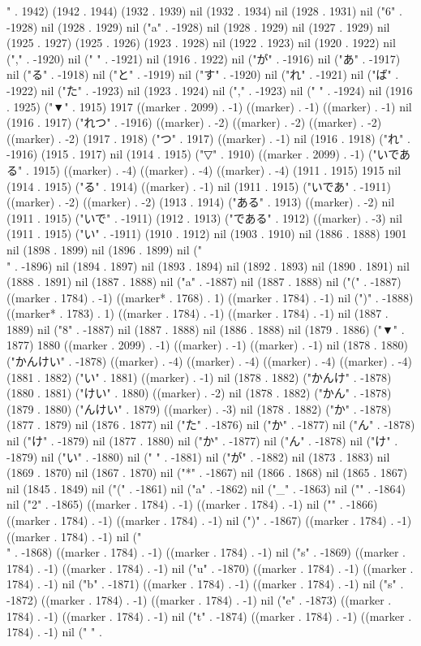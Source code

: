 " . 1942) (1942 . 1944) (1932 . 1939) nil (1932 . 1934) nil (1928 . 1931) nil ("6" . -1928) nil (1928 . 1929) nil ("a" . -1928) nil (1928 . 1929) nil (1927 . 1929) nil (1925 . 1927) (1925 . 1926) (1923 . 1928) nil (1922 . 1923) nil (1920 . 1922) nil ("," . -1920) nil (" " . -1921) nil (1916 . 1922) nil ("が" . -1916) nil ("あ" . -1917) nil ("る" . -1918) nil ("と" . -1919) nil ("す" . -1920) nil ("れ" . -1921) nil ("ば" . -1922) nil ("た" . -1923) nil (1923 . 1924) nil ("," . -1923) nil (" " . -1924) nil (1916 . 1925) ("▼" . 1915) 1917 ((marker . 2099) . -1) ((marker) . -1) ((marker) . -1) nil (1916 . 1917) ("れつ" . -1916) ((marker) . -2) ((marker) . -2) ((marker) . -2) ((marker) . -2) (1917 . 1918) ("つ" . 1917) ((marker) . -1) nil (1916 . 1918) ("れ" . -1916) (1915 . 1917) nil (1914 . 1915) ("▽" . 1910) ((marker . 2099) . -1) ("いである" . 1915) ((marker) . -4) ((marker) . -4) ((marker) . -4) (1911 . 1915) 1915 nil (1914 . 1915) ("る" . 1914) ((marker) . -1) nil (1911 . 1915) ("いであ" . -1911) ((marker) . -2) ((marker) . -2) (1913 . 1914) ("ある" . 1913) ((marker) . -2) nil (1911 . 1915) ("いで" . -1911) (1912 . 1913) ("である" . 1912) ((marker) . -3) nil (1911 . 1915) ("い" . -1911) (1910 . 1912) nil (1903 . 1910) nil (1886 . 1888) 1901 nil (1898 . 1899) nil (1896 . 1899) nil ("\\" . -1896) nil (1894 . 1897) nil (1893 . 1894) nil (1892 . 1893) nil (1890 . 1891) nil (1888 . 1891) nil (1887 . 1888) nil ("a" . -1887) nil (1887 . 1888) nil ("(" . -1887) ((marker . 1784) . -1) ((marker* . 1768) . 1) ((marker . 1784) . -1) nil (")" . -1888) ((marker* . 1783) . 1) ((marker . 1784) . -1) ((marker . 1784) . -1) nil (1887 . 1889) nil ("8" . -1887) nil (1887 . 1888) nil (1886 . 1888) nil (1879 . 1886) ("▼" . 1877) 1880 ((marker . 2099) . -1) ((marker) . -1) ((marker) . -1) nil (1878 . 1880) ("かんけい" . -1878) ((marker) . -4) ((marker) . -4) ((marker) . -4) ((marker) . -4) (1881 . 1882) ("い" . 1881) ((marker) . -1) nil (1878 . 1882) ("かんけ" . -1878) (1880 . 1881) ("けい" . 1880) ((marker) . -2) nil (1878 . 1882) ("かん" . -1878) (1879 . 1880) ("んけい" . 1879) ((marker) . -3) nil (1878 . 1882) ("か" . -1878) (1877 . 1879) nil (1876 . 1877) nil ("た" . -1876) nil ("か" . -1877) nil ("ん" . -1878) nil ("け" . -1879) nil (1877 . 1880) nil ("か" . -1877) nil ("ん" . -1878) nil ("け" . -1879) nil ("い" . -1880) nil (" " . -1881) nil ("が" . -1882) nil (1873 . 1883) nil (1869 . 1870) nil (1867 . 1870) nil ("*" . -1867) nil (1866 . 1868) nil (1865 . 1867) nil (1845 . 1849) nil ("(" . -1861) nil ("a" . -1862) nil ("_" . -1863) nil ("{" . -1864) nil ("2" . -1865) ((marker . 1784) . -1) ((marker . 1784) . -1) nil ("}" . -1866) ((marker . 1784) . -1) ((marker . 1784) . -1) nil (")" . -1867) ((marker . 1784) . -1) ((marker . 1784) . -1) nil ("\\" . -1868) ((marker . 1784) . -1) ((marker . 1784) . -1) nil ("s" . -1869) ((marker . 1784) . -1) ((marker . 1784) . -1) nil ("u" . -1870) ((marker . 1784) . -1) ((marker . 1784) . -1) nil ("b" . -1871) ((marker . 1784) . -1) ((marker . 1784) . -1) nil ("s" . -1872) ((marker . 1784) . -1) ((marker . 1784) . -1) nil ("e" . -1873) ((marker . 1784) . -1) ((marker . 1784) . -1) nil ("t" . -1874) ((marker . 1784) . -1) ((marker . 1784) . -1) nil (" " . 